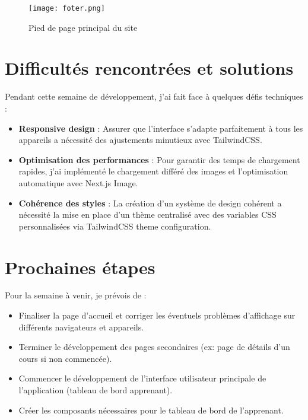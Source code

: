 \documentclass[12pt, a4paper]{article}
\begin{document}
\begin{figure}[h!]
  \centering
  \texttt{[image: foter.png]} 
  \caption{Pied de page principal du site}
  \label{fig:footer_main}
\end{figure}

\clearpage 

\section{Difficultés rencontrées et solutions}

Pendant cette semaine de développement, j'ai fait face à quelques défis techniques :

\begin{itemize}
  \item \textbf{Responsive design} : Assurer que l'interface s'adapte parfaitement à tous les appareils a nécessité des ajustements minutieux avec TailwindCSS.
  \item \textbf{Optimisation des performances} : Pour garantir des temps de chargement rapides, j'ai implémenté le chargement différé des images et l'optimisation automatique avec Next.js Image.
  \item \textbf{Cohérence des styles} : La création d'un système de design cohérent a nécessité la mise en place d'un thème centralisé avec des variables CSS personnalisées via TailwindCSS theme configuration.
\end{itemize}

\section{Prochaines étapes}

Pour la semaine à venir, je prévois de :

\begin{itemize}
  \item Finaliser la page d'accueil et corriger les éventuels problèmes d'affichage sur différents navigateurs et appareils.
  \item Terminer le développement des pages secondaires (ex: page de détails d'un cours si non commencée).
  \item Commencer le développement de l'interface utilisateur principale de l'application (tableau de bord apprenant).
  \item Créer les composants nécessaires pour le tableau de bord de l'apprenant.

\end{itemize}
\end{document}
